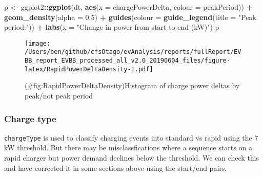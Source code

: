 \documentclass[]{article}
\newenvironment{Shaded}{\begin{snugshade}}{\end{snugshade}}
\newcommand{\CommentTok}[1]{\textcolor[rgb]{0.56,0.35,0.01}{\textit{#1}}}
\newcommand{\DataTypeTok}[1]{\textcolor[rgb]{0.13,0.29,0.53}{#1}}
\newcommand{\FloatTok}[1]{\textcolor[rgb]{0.00,0.00,0.81}{#1}}
\newcommand{\KeywordTok}[1]{\textcolor[rgb]{0.13,0.29,0.53}{\textbf{#1}}}
\newcommand{\NormalTok}[1]{#1}
\newcommand{\OperatorTok}[1]{\textcolor[rgb]{0.81,0.36,0.00}{\textbf{#1}}}
\newcommand{\StringTok}[1]{\textcolor[rgb]{0.31,0.60,0.02}{#1}}
\begin{document}
\begin{Shaded}
\begin{Highlighting}[]
\NormalTok{p <-}\StringTok{ }\NormalTok{ggplot2}\OperatorTok{::}\KeywordTok{ggplot}\NormalTok{(dt, }\KeywordTok{aes}\NormalTok{(}\DataTypeTok{x =}\NormalTok{ chargePowerDelta, }\DataTypeTok{colour =}\NormalTok{ peakPeriod)) }\OperatorTok{+}
\StringTok{  }\KeywordTok{geom_density}\NormalTok{(}\DataTypeTok{alpha =} \FloatTok{0.5}\NormalTok{) }\OperatorTok{+}
\StringTok{  }\KeywordTok{guides}\NormalTok{(}\DataTypeTok{colour =} \KeywordTok{guide_legend}\NormalTok{(}\DataTypeTok{title =} \StringTok{"Peak period:"}\NormalTok{)) }\OperatorTok{+}
\StringTok{  }\KeywordTok{labs}\NormalTok{(}\DataTypeTok{x =} \StringTok{"Change in power from start to end (kW)"}\NormalTok{)}
\NormalTok{p}
\end{Highlighting}
\end{Shaded}

\begin{figure}
\centering
\texttt{[image: /Users/ben/github/cfsOtago/evAnalysis/reports/fullReport/EVBB\_report\_EVBB\_processed\_all\_v2.0\_20190604\_files/figure-latex/RapidPowerDeltaDensity-1.pdf]}
\caption{(\#fig:RapidPowerDeltaDensity)Histogram of charge power deltas by peak/not peak period}
\end{figure}

\hypertarget{charge-type}{%
\subsubsection{Charge type}\label{charge-type}}

\texttt{chargeType} is used to classify charging events into standard vs rapid using the 7 kW threshold. But there may be misclassfications where a sequence starts on a rapid charger but power demand declines below the threshold. We can check this and have corrected it in some sections above using the start/end pairs.

\begin{Shaded}
\end{Shaded}
\end{document}
